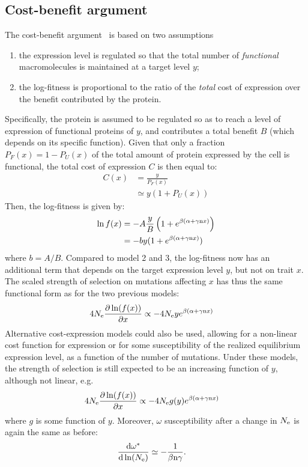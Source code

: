 \subsection{Cost-benefit argument}
The cost-benefit argument~\citep{Beaulieu2018} is based on two assumptions
\begin{enumerate}
 \item the expression level is regulated so that the total number of \emph{functional} macromolecules is maintained at a target level $y$;
 \item the log-fitness is proportional to the ratio of the \emph{total} cost of expression over the benefit contributed by the protein.
\end{enumerate}
Specifically, the protein is assumed to be regulated so as to reach a level of expression of functional proteins of $y$, and contributes a total benefit $B$ (which depends on its specific function). Given that only a fraction $P_{F}(x) = 1-P_{U}(x)$ of the total amount of protein expressed by the cell is functional, the total cost of expression $C$ is then equal to:
\begin{align}
C(x) & = \frac{y}{P_{F}(x)}
\\ & \simeq y (1 + P_{U}(x))
\end{align}
Then, the log-fitness is given by:
\begin{align}
\ln f (x) & = -A \frac{y}{B} \left( 1 + e^{\beta(\alpha + \gamma\text{n} x)} \right)
\\
& = -by (1 + e^{\beta(\alpha + \gamma\text{n} x)})
\end{align}
where $b = A /B$. Compared to model 2 and 3, the log-fitness now has an additional term that depends on the target expression level $y$, but not on trait $x$. The scaled strength of selection on mutations affecting $x$ has thus the same functional form as for the two previous models:
\begin{align}
4 N_{\mathrm{e}} \frac{\partial \ln (f(x))}{\partial x} & \propto -4 N_{\mathrm{e}} y e^{\beta(\alpha + \gamma\text{n} x)}
\end{align}
Alternative cost-expression models could also be used, allowing for a non-linear cost function for expression or for some susceptibility of the realized equilibrium expression level, as a function of the number of mutations. Under these models, the strength of selection is still expected to be an increasing function of $y$, although not linear, e.g.
\begin{align}
4 N_{\mathrm{e}} \frac{\partial \ln (f(x))}{\partial x} & \propto -4 N_{\mathrm{e}} g(y) e^{\beta(\alpha + \gamma\text{n} x)}
\end{align}
where $g$ is some function of $y$.
Moreover, $\omega$ susceptibility after a change in $N_{\mathrm{e}}$ is again the same as before:
\begin{align}
\frac{ \mathrm{d} \omega^{*}}{\mathrm{d} \ln (N_{\mathrm{e}})} & \simeq - \frac{1}{\beta \text{n} \gamma}.
\end{align}
